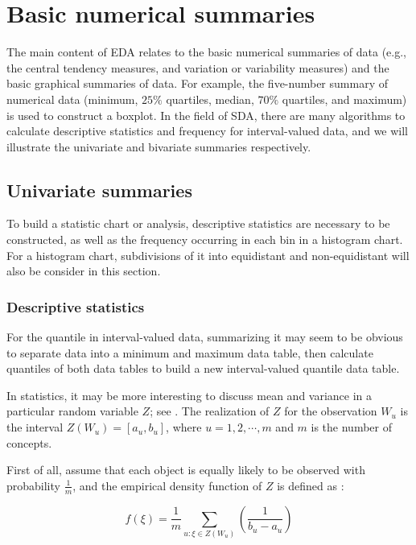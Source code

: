 \documentclass[article]{jss}
\begin{document}
\section{Basic numerical summaries}

The main content of EDA relates to the basic numerical summaries of data (e.g., the central tendency measures, and variation or variability measures) and the basic graphical summaries of data. For example, the five-number summary of numerical data (minimum, $25\%$ quartiles, median, $70\%$ quartiles, and maximum) is used to construct a boxplot. In the field of SDA, there are many algorithms to calculate descriptive statistics and frequency for interval-valued data, and we will illustrate the univariate and bivariate summaries respectively.

\subsection{Univariate summaries}

To build a statistic chart or analysis, descriptive statistics are necessary to be constructed, as well as the frequency occurring in each bin in a histogram chart. For a histogram chart, subdivisions of it into equidistant and non-equidistant will also be consider in this section.

\subsubsection{Descriptive statistics}

For the quantile in interval-valued data, summarizing it may seem to be obvious to separate data into a minimum and maximum data table, then calculate quantiles of both data tables to build a new interval-valued quantile data table.

In statistics, it may be more interesting to discuss mean and variance in a particular random variable $Z$; see \cite{bertrand:2000}. The realization of $Z$ for the observation $W_u$ is the interval $Z(W_u) = [a_u,b_u]$, where $u=1,2,\cdots,m$ and $m$ is the number of concepts.

First of all, assume that each object is equally likely to be observed with probability $\frac{1}{m}$, and the empirical density function of $Z$ is defined as : 

\begin{equation}\label{eq:dist1}
f(\xi) = \frac{1}{m} \sum_{u:\xi \in Z(W_u)}(\frac{1}{b_u-a_u})
\end{equation}
\end{document}
